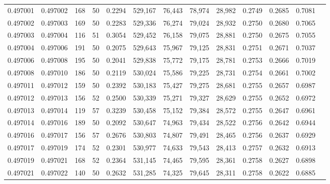 \begin{tabular}{rrrrrrrrrrrrr}
0.497001 & 0.497002 &   168 &  50 &                                     0.2294 & 529,167 &  76,443 &  78,974 &  28,982 & 0.2749 & 0.2685 & 0.7081 \\
0.497002 & 0.497003 &   169 &  50 &                                     0.2283 & 529,336 &  76,274 &  79,024 &  28,932 & 0.2750 & 0.2680 & 0.7065 \\
0.497003 & 0.497004 &   116 &  51 &                                     0.3054 & 529,452 &  76,158 &  79,075 &  28,881 & 0.2750 & 0.2675 & 0.7055 \\
0.497004 & 0.497006 &   191 &  50 &                                     0.2075 & 529,643 &  75,967 &  79,125 &  28,831 & 0.2751 & 0.2671 & 0.7037 \\
0.497006 & 0.497008 &   195 &  50 &                                     0.2041 & 529,838 &  75,772 &  79,175 &  28,781 & 0.2753 & 0.2666 & 0.7019 \\
0.497008 & 0.497010 &   186 &  50 &                                     0.2119 & 530,024 &  75,586 &  79,225 &  28,731 & 0.2754 & 0.2661 & 0.7002 \\
0.497011 & 0.497012 &   159 &  50 &                                     0.2392 & 530,183 &  75,427 &  79,275 &  28,681 & 0.2755 & 0.2657 & 0.6987 \\
0.497012 & 0.497013 &   156 &  52 &                                     0.2500 & 530,339 &  75,271 &  79,327 &  28,629 & 0.2755 & 0.2652 & 0.6972 \\
0.497013 & 0.497014 &   119 &  57 &                                     0.3239 & 530,458 &  75,152 &  79,384 &  28,572 & 0.2755 & 0.2647 & 0.6961 \\
0.497014 & 0.497016 &   189 &  50 &                                     0.2092 & 530,647 &  74,963 &  79,434 &  28,522 & 0.2756 & 0.2642 & 0.6944 \\
0.497016 & 0.497017 &   156 &  57 &                                     0.2676 & 530,803 &  74,807 &  79,491 &  28,465 & 0.2756 & 0.2637 & 0.6929 \\
0.497017 & 0.497019 &   174 &  52 &                                     0.2301 & 530,977 &  74,633 &  79,543 &  28,413 & 0.2757 & 0.2632 & 0.6913 \\
0.497019 & 0.497021 &   168 &  52 &                                     0.2364 & 531,145 &  74,465 &  79,595 &  28,361 & 0.2758 & 0.2627 & 0.6898 \\
0.497021 & 0.497022 &   140 &  50 &                                     0.2632 & 531,285 &  74,325 &  79,645 &  28,311 & 0.2758 & 0.2622 & 0.6885 \\

\end{tabular}

